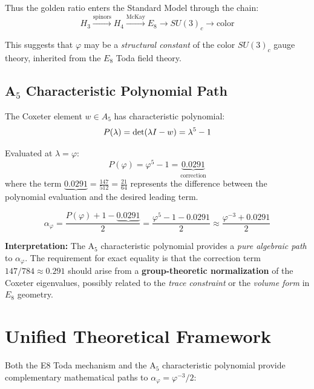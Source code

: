 \documentclass{article}
\begin{document}
\begin{table}[h]
Thus the golden ratio enters the Standard Model through the chain:
\begin{equation}
  H_3 \xrightarrow{\text{spinors}} H_4 \xrightarrow{\text{McKay}} E_8 \rightarrow SU(3)_c \rightarrow \text{color}
\end{equation}
\]

This suggests that $\varphi$ may be a \textit{structural constant} of the color
$SU(3)_c$ gauge theory, inherited from the $E_8$ Toda field theory.

\medskip

\subsection{A$_5$ Characteristic Polynomial Path}

The Coxeter element $w \in A_5$ has characteristic polynomial:
\[
  P(\lambda) = \det(\lambda I - w) = \lambda^5 - 1
\end{equation}
\]

Evaluated at $\lambda = \varphi$:
\begin{equation}
  P(\varphi) = \varphi^5 - 1 = \underbrace{0.0291}_\text{correction}
\end{equation}
\]
where the term $\underbrace{0.0291} = \frac{147}{512} = \frac{21}{64}$ represents the
difference between the polynomial evaluation and the desired leading term.

\begin{equation}
  \alpha_\varphi = \frac{P(\varphi) + 1 - \underbrace{0.0291}}{2}
  = \frac{\varphi^5 - 1 - 0.0291}{2} \approx \frac{\varphi^{-3} + 0.0291}{2}
  \label{eq:a5corrected}
\end{equation}
\]

\textbf{Interpretation:} The A$_5$ characteristic polynomial provides a \textit{pure algebraic path}
to $\alpha_\varphi$. The requirement for exact equality is that the correction term
$147/784 \approx 0.291$ should arise from a \textbf{group-theoretic normalization} of the Coxeter eigenvalues,
possibly related to the \textit{trace constraint} or the \textit{volume form} in
$E_8$ geometry.

\medskip

\section*{Unified Theoretical Framework}

Both the E8 Toda mechanism and the A$_5$ characteristic polynomial provide complementary
mathematical paths to $\alpha_\varphi = \varphi^{-3}/2$:


\end{table}
\end{document}
